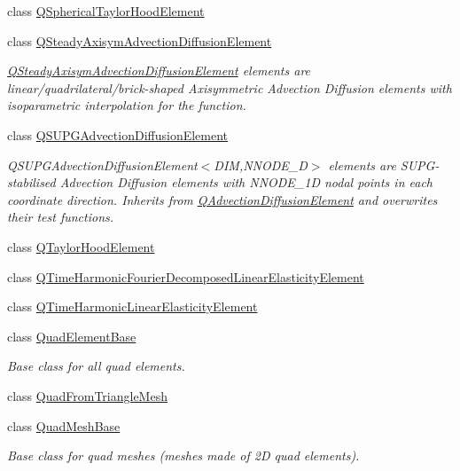 \begin{DoxyCompactItemize}
\item 
class \hyperlink{classoomph_1_1QSphericalTaylorHoodElement}{Q\+Spherical\+Taylor\+Hood\+Element}
\item 
class \hyperlink{classoomph_1_1QSteadyAxisymAdvectionDiffusionElement}{Q\+Steady\+Axisym\+Advection\+Diffusion\+Element}
\begin{DoxyCompactList}\small\item\em \hyperlink{classoomph_1_1QSteadyAxisymAdvectionDiffusionElement}{Q\+Steady\+Axisym\+Advection\+Diffusion\+Element} elements are linear/quadrilateral/brick-\/shaped Axisymmetric Advection Diffusion elements with isoparametric interpolation for the function. \end{DoxyCompactList}\item 
class \hyperlink{classoomph_1_1QSUPGAdvectionDiffusionElement}{Q\+S\+U\+P\+G\+Advection\+Diffusion\+Element}
\begin{DoxyCompactList}\small\item\em Q\+S\+U\+P\+G\+Advection\+Diffusion\+Element$<$\+D\+I\+M,\+N\+N\+O\+D\+E\+\_\+D$>$ elements are S\+U\+P\+G-\/stabilised Advection Diffusion elements with N\+N\+O\+D\+E\+\_\+1D nodal points in each coordinate direction. Inherits from \hyperlink{classoomph_1_1QAdvectionDiffusionElement}{Q\+Advection\+Diffusion\+Element} and overwrites their test functions. \end{DoxyCompactList}\item 
class \hyperlink{classoomph_1_1QTaylorHoodElement}{Q\+Taylor\+Hood\+Element}
\item 
class \hyperlink{classoomph_1_1QTimeHarmonicFourierDecomposedLinearElasticityElement}{Q\+Time\+Harmonic\+Fourier\+Decomposed\+Linear\+Elasticity\+Element}
\item 
class \hyperlink{classoomph_1_1QTimeHarmonicLinearElasticityElement}{Q\+Time\+Harmonic\+Linear\+Elasticity\+Element}
\item 
class \hyperlink{classoomph_1_1QuadElementBase}{Quad\+Element\+Base}
\begin{DoxyCompactList}\small\item\em Base class for all quad elements. \end{DoxyCompactList}\item 
class \hyperlink{classoomph_1_1QuadFromTriangleMesh}{Quad\+From\+Triangle\+Mesh}
\item 
class \hyperlink{classoomph_1_1QuadMeshBase}{Quad\+Mesh\+Base}
\begin{DoxyCompactList}\small\item\em Base class for quad meshes (meshes made of 2D quad elements). \end{DoxyCompactList}\item 

\end{DoxyCompactItemize}
